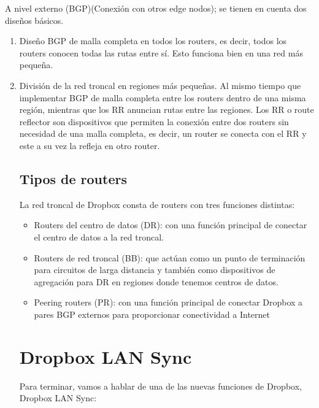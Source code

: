 A nivel externo (BGP)(Conexión con otros edge nodos); se tienen en cuenta dos diseños básicos. 
\begin{enumerate}
\item Diseño BGP de malla completa en todos los routers, es decir, todos los routers conocen todas las rutas entre sí. Esto funciona bien en una red más pequeña.

\item División de la red troncal en regiones más pequeñas. Al mismo tiempo que implementar BGP de malla completa entre los routers dentro de una misma región, mientras que los RR anuncian rutas entre las regiones.
Los RR o route reflector son dispositivos que permiten la conexión entre dos routers sin necesidad de una malla completa, es decir, un router se conecta con el RR y este a su vez la refleja en otro router.


\subsection{Tipos de routers}
La red troncal de Dropbox consta de routers con tres funciones distintas:
\begin{itemize}
\item Routers del centro de datos (DR): con una función principal de conectar el centro de datos a la red troncal.
\item Routers de red troncal (BB): que actúan como un punto de terminación para circuitos de larga distancia y también como dispositivos de agregación para DR en regiones donde tenemos centros de datos.
\item Peering routers (PR): con una función principal de conectar Dropbox a pares BGP externos para proporcionar conectividad a Internet

\end{itemize}



\section{Dropbox LAN Sync}

Para terminar, vamos a hablar de una de las nuevas funciones de Dropbox, Dropbox LAN Sync:



\end{enumerate}
